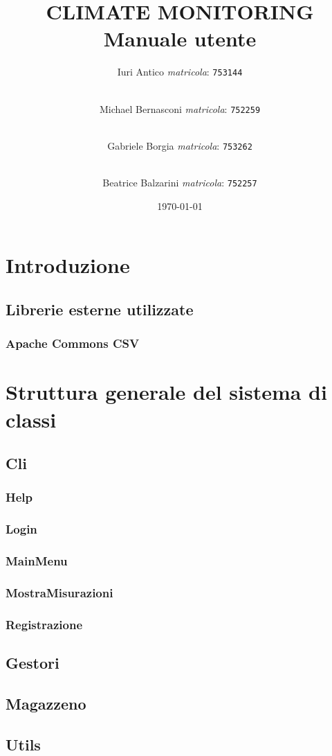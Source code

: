 \documentclass[a4paper, 12pt,twoside]{article}
\title {
	CLIMATE MONITORING \\
	{Manuale utente}}
\author{
	Iuri Antico \textit{matricola}:
	\texttt{753144}
	\and \\
	Michael Bernasconi \textit{matricola}:
	\texttt{752259}
	\and \\
	Gabriele Borgia \textit{matricola}:
	\texttt{753262}
	\and \\
	Beatrice Balzarini \textit{matricola}:
	\texttt{752257}
}
\date{\today}
\begin{document}
	
	\makeatletter
	\begin{titlepage}
		\maketitle
	\end{titlepage}
	\makeatother

	\tableofcontents

	\newpage
	
	\section{Introduzione}
		\subsection{Librerie esterne utilizzate}
		
			\subsubsection{Apache Commons CSV}
			
	\section{Struttura generale del sistema di classi}
		\subsection{Cli}
			\subsubsection{Help}
			\subsubsection{Login}
			\subsubsection{MainMenu}
			\subsubsection{MostraMisurazioni}
			\subsubsection{Registrazione}

		
		
		\subsection{Gestori}
		
		\subsection{Magazzeno}
		
		\subsection{Utils}
		
		\newpage

	
	

		
	
	

	

	

	
	
	
	
	
\end{document}
